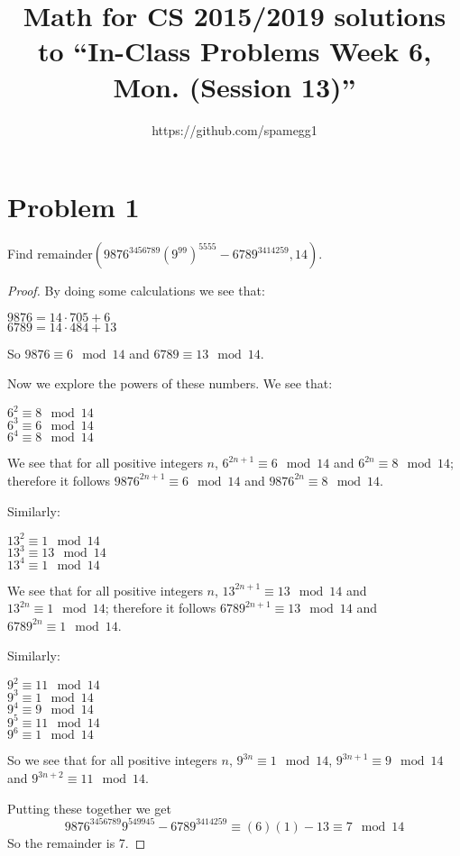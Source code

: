\documentclass[14pt]{extarticle}
\title{Math for CS 2015/2019 solutions to ``In-Class Problems Week 6, Mon. (Session 13)''}
\author{https://github.com/spamegg1}
\begin{document}
\maketitle
\tableofcontents

\section{Problem 1}
Find remainder$(9876^{3456789} (9^{99})^{5555} - 6789^{3414259}, 14)$.

\begin{proof}
By doing some calculations we see that:
\begin{center}
$9876 = 14 \cdot 705 + 6$\\
$6789 = 14 \cdot 484 + 13$
\end{center}

So $9876 \equiv 6 \mod 14$ and $6789 \equiv 13 \mod 14$.

Now we explore the powers of these numbers. We see that:
\begin{center}
$6^2 \equiv 8 \mod 14$\\
$6^3 \equiv 6 \mod 14$\\
$6^4 \equiv 8 \mod 14$\\
\end{center}

We see that for all positive integers $n$, $6^{2n+1} \equiv 6 \mod 14$ and $6^{2n} \equiv 8 \mod 14$; therefore it follows $9876^{2n+1} \equiv 6 \mod 14$ and $9876^{2n} \equiv 8 \mod 14$.

Similarly:
\begin{center}
$13^2 \equiv 1 \mod 14$\\
$13^3 \equiv 13 \mod 14$\\
$13^4 \equiv 1 \mod 14$\\
\end{center}

We see that for all positive integers $n$, $13^{2n+1} \equiv 13 \mod 14$ and $13^{2n} \equiv 1 \mod 14$; therefore it follows $6789^{2n+1} \equiv 13 \mod 14$ and $6789^{2n} \equiv 1 \mod 14$.

Similarly:
\begin{center}
$9^2 \equiv 11 \mod 14$\\
$9^3 \equiv 1 \mod 14$\\
$9^4 \equiv 9 \mod 14$\\
$9^5 \equiv 11 \mod 14$\\
$9^6 \equiv 1 \mod 14$\\
\end{center}

So we see that for all positive integers $n$, $9^{3n} \equiv 1 \mod 14$, $9^{3n+1} \equiv 9 \mod 14$ and $9^{3n+2} \equiv 11 \mod 14$.

Putting these together we get
$$
9876^{3456789} 9^{549945} - 6789^{3414259} \equiv (6)(1) - 13 \equiv 7 \mod 14
$$
So the remainder is 7.
\end{proof}
\end{document}
